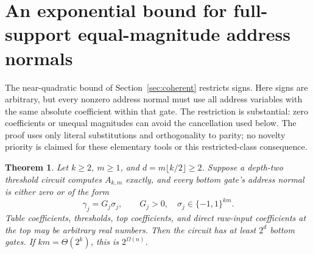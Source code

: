 \documentclass[11pt,letterpaper]{article}
\newtheorem{theorem}{Theorem}
\theoremstyle{remark}
\newcommand{\sect}[1]{\section{\texorpdfstring{\color{ink}#1}{#1}}}
\begin{document}
\sect{An exponential bound for full-support equal-magnitude address normals}\label{sec:fullsign}

The near-quadratic bound of Section~\ref{sec:coherent} restricts signs.
Here signs are arbitrary, but every nonzero address normal must use all
address variables with the same absolute coefficient within that gate.
The restriction is substantial: zero coefficients or unequal magnitudes
can avoid the cancellation used below. The proof uses only literal
substitutions and orthogonality to parity; no novelty priority is claimed
for these elementary tools or this restricted-class consequence.

\begin{theorem}\label{thm:fullsign}
Let $k\ge2$, $m\ge1$, and $d=m\lfloor k/2\rfloor\ge2$. Suppose a depth-two
threshold circuit computes $A_{k,m}$ exactly, and every bottom gate's address
normal is either zero or of the form
$$
\gamma_j=G_j\sigma_j,\qquad G_j>0,\quad
\sigma_j\in\{-1,1\}^{km}.
$$
Table coefficients, thresholds, top coefficients, and direct raw-input
coefficients at the top may be arbitrary real numbers. Then the circuit
has at least $2^d$ bottom gates. If $km=\Theta(2^k)$, this is $2^{\Omega(n)}$.
\end{theorem}
\end{document}
